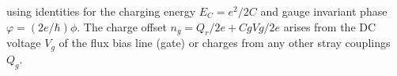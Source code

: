 \documentclass[12 pt]{book}
\begin{document}
using identities for the charging energy $E_C=e^2/2C$ and gauge invariant phase $\varphi=(2e/\hbar)\phi$. The charge offset $n_g=Q_r/2e+CgVg/2e$ arises from the DC voltage $V_g$ of the flux bias line (gate) or charges from any other stray couplings $Q_g$. 



%
\end{document}
